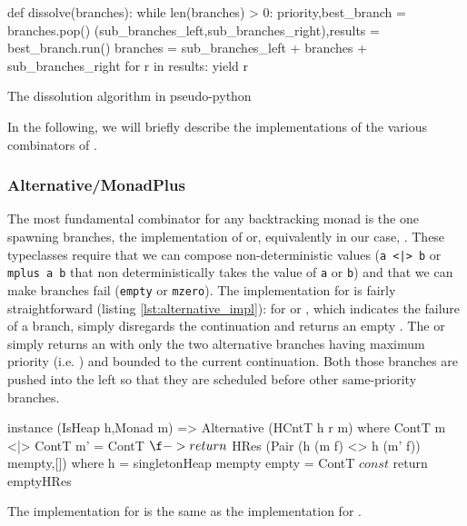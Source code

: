 \begin{code}
\begin{pycode}
def dissolve(branches):
    while len(branches) > 0:
        priority,best_branch = branches.pop()
        (sub_branches_left,sub_branches_right),results = best_branch.run()
        branches = sub_branches_left + branches + sub_branches_right
        for r in results:
            yield r
\end{pycode}
  \caption{\label{lst:dissolve_algo}The dissolution algorithm in
    pseudo-python}
\end{code}

In the following, we will briefly describe the implementations of
the various combinators of .

\subsubsection{Alternative/MonadPlus}

The most fundamental combinator for any backtracking monad is the one
spawning branches, the implementation of  or,
equivalently in our case, . These typeclasses require
that we can compose non-deterministic values (\texttt{a <|> b} or
\texttt{mplus a b} that non deterministically takes the value of
\texttt{a} or \texttt{b}) and that we can make branches fail
(\texttt{empty} or \texttt{mzero}). The implementation for
 is fairly straightforward (listing
\ref{lst:alternative_impl}): for  or , which
indicates the failure of a branch, simply disregards the continuation and
returns an empty . The  or \hask{<|>} simply
returns an  with only the two alternative branches having
maximum priority (i.e. ) and bounded to the
current continuation. Both those branches are pushed into the left so
that they are scheduled before other same-priority branches.

\begin{code}
\begin{haskellcode}
instance (IsHeap h,Monad m) => Alternative (HCntT h r m) where
  ContT m <|> ContT m' = ContT $ \f -> return
    $ HRes (Pair (h (m f) <> h (m' f)) mempty,[])
    where
      h = singletonHeap mempty
  empty = ContT $ const $ return emptyHRes
\end{haskellcode}
  \caption{\label{lst:alternative_impl}The implementation for
     is the same as the implementation for
    .}
\end{code}

